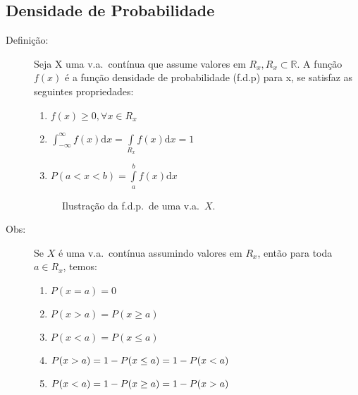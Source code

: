    \subsection{Densidade de Probabilidade}
   \begin{description}
     \item [Definição:] Seja X uma v.a.\ contínua que assume valores em $R_{x},R_{x} \subset \mathbb{R}$.
       A função $f(x)$ é a função densidade de probabilidade (f.d.p) para x, se satisfaz as 
       seguintes propriedades: 

       \begin{enumerate}[label=(\roman*)]
         \item $\displaystyle{f(x)\geq 0, \forall x \in R_{x}}$\\
         \item $\displaystyle{\int_{-\infty}^{\infty} \!f(x) \mathrm{d}x= \int \limits_{R_{x}} \!f(x) \mathrm{d}x=1}$
         \item $P(a<x<b)=\displaystyle{\int \limits^b_a \!f(x) \mathrm{d}x}$
       \end{enumerate}
       \begin{figure}[htpb]
         \centering
         
         \caption{Ilustração da f.d.p.\ de uma v.a.\ $X$.}
         \label{fig:25}

       \end{figure}
     \item [Obs:] Se $X$ é uma v.a.\ contínua assumindo valores em $R_{x}$, então para toda 
       $a \in R_{x}$, temos: 

       \begin{enumerate}[label=(\alph*)]

         \item $P(x=a)=0$
         \item $P(x>a)=P(x\geq a)$
         \item $P(x<a)=P(x\leq a)$
         \item $P(x>a)=1- P(x \leq a)\\ = 1-P(x<a)$
         \item $P(x<a)=1-P(x \geq a)\\= 1-P(x>a)$

       \end{enumerate}

\end{description}

